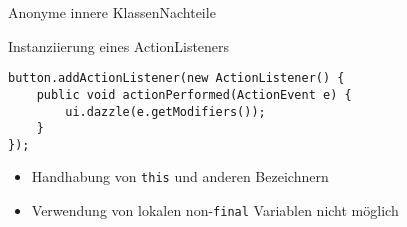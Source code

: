 \begin{frame}[fragile]{Anonyme innere Klassen}{Nachteile}

    \begin{center}
        \begin{minipage}[b]{0.75\textwidth}
            \begin{block}{Instanziierung eines ActionListeners \citep{goetz13}}
                \begin{lstlisting}
button.addActionListener(new ActionListener() {
    public void actionPerformed(ActionEvent e) {
        ui.dazzle(e.getModifiers());
    }
});
                \end{lstlisting}
            \end{block}
        \end{minipage}
    \end{center}

    \begin{itemize}
        \item Handhabung von \texttt{this} und anderen Bezeichnern
        \item Verwendung von lokalen non-\texttt{final} Variablen nicht möglich
    \end{itemize}
\end{frame}

